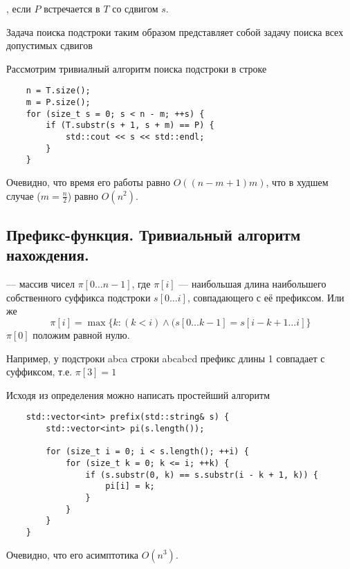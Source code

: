 \begin{definition}
	, если $P$ встречается в $T$ со сдвигом $s$.
\end{definition}

\begin{remark}
	Задача поиска подстроки таким образом представляет собой задачу поиска всех допустимых сдвигов
\end{remark}

Рассмотрим тривиалный алгоритм поиска подстроки в строке

\begin{lstlisting}
	n = T.size();
	m = P.size();
	for (size_t s = 0; s < n - m; ++s) {
		if (T.substr(s + 1, s + m) == P) {
			std::cout << s << std::endl;
		}
	}
\end{lstlisting}

\begin{remark}
	Очевидно, что время его работы равно $O((n - m + 1)m)$, что в худшем случае ($m = \frac{n}{2}$) равно
	$O(n^2)$.
\end{remark}

\subsection{Префикс-функция. Тривиальный алгоритм нахождения.}

\begin{definition}
	 --- массив чисел $\pi [0 \ldots n-1]$, где $\pi [i]$ --- наибольшая длина наибольшего
	собственного суффикса подстроки $s[0 \ldots i]$, совпадающего с её префиксом. Или же
	 \[
		 \pi[i] = \max \{ k \colon (k < i) \wedge (s[0 \ldots k-1] = s[i - k + 1 \ldots i] \}
	\]
	$\pi[0]$ положим равной нулю.
\end{definition}

Например, у подстроки abca строки abcabcd префикс длины 1 совпадает с суффиксом, т.е. $\pi [3] = 1$

Исходя из определения можно написать простейший алгоритм

\begin{lstlisting}
	std::vector<int> prefix(std::string& s) {
		std::vector<int> pi(s.length());

		for (size_t i = 0; i < s.length(); ++i) {
			for (size_t k = 0; k <= i; ++k) {
				if (s.substr(0, k) == s.substr(i - k + 1, k)) {
					pi[i] = k;
				}
			}
		}
	}
\end{lstlisting}

\begin{remark}
	Очевидно, что его асимптотика $O(n^3)$.
\end{remark}

